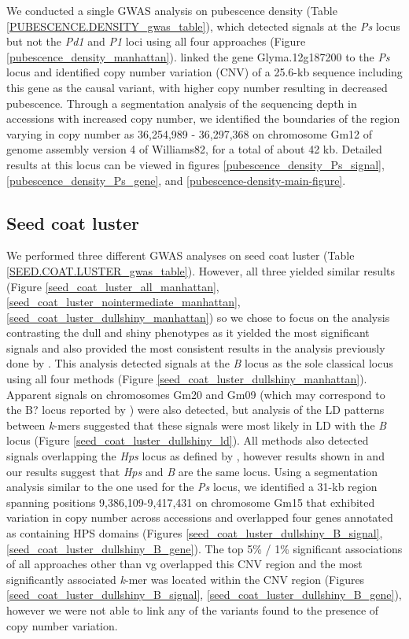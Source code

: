 We conducted a single GWAS analysis on pubescence density (Table
\ref{PUBESCENCE.DENSITY_gwas_table}), which detected signals at the \emph{Ps}
locus but not the \emph{Pd1} and \emph{P1} loci using all four approaches
(Figure \ref{pubescence_density_manhattan}). \cite{liu2020ps} linked the gene
Glyma.12g187200 to the \emph{Ps} locus and identified copy number variation
(CNV) of a 25.6-kb sequence including this gene as the causal variant, with
higher copy number resulting in decreased pubescence. Through a segmentation
analysis of the sequencing depth in accessions with increased copy number, we
identified the boundaries of the region varying in copy number as 36,254,989 -
36,297,368 on chromosome Gm12 of genome assembly version 4 of Williams82, for a
total of about 42 kb. Detailed results at this locus can be viewed in figures
\ref{pubescence_density_Ps_signal}, \ref{pubescence_density_Ps_gene}, and
\ref{pubescence-density-main-figure}.

\subsection*{Seed coat luster}
\label{sv-gwas-seed-coat-luster}

We performed three different GWAS analyses on seed coat luster (Table
\ref{SEED.COAT.LUSTER_gwas_table}).  However, all three yielded similar results
(Figure \ref{seed_coat_luster_all_manhattan},
\ref{seed_coat_luster_nointermediate_manhattan},
\ref{seed_coat_luster_dullshiny_manhattan}) so we chose to focus on the
analysis contrasting the dull and shiny phenotypes as it yielded the most
significant signals and also provided the most consistent results in the
analysis previously done by \cite{bandillo2017}. This analysis detected
signals at the \emph{B} locus as the sole classical locus using all four
methods (Figure \ref{seed_coat_luster_dullshiny_manhattan}). Apparent signals
on chromosomes Gm20 and Gm09 (which may correspond to the B? locus reported by
\cite{bandillo2017}) were also detected, but analysis of the LD patterns
between \emph{k}-mers suggested that these signals were most likely in LD with
the \emph{B} locus (Figure \ref{seed_coat_luster_dullshiny_ld}). All methods
also detected signals overlapping the \emph{Hps} locus as defined by
\cite{bandillo2017}, however results shown in \cite{gijzen2003} and our results
suggest that \emph{Hps} and \emph{B} are the same locus. Using a segmentation analysis
similar to the one used for the \emph{Ps} locus, we identified a 31-kb region
spanning positions 9,386,109-9,417,431 on chromosome Gm15 that exhibited
variation in copy number across accessions and overlapped four genes annotated
as containing HPS domains (Figures \ref{seed_coat_luster_dullshiny_B_signal},
\ref{seed_coat_luster_dullshiny_B_gene}). The top 5\% / 1\% significant
associations of all approaches other than vg overlapped this CNV region and the
most significantly associated \emph{k}-mer was located within the CNV region
(Figures \ref{seed_coat_luster_dullshiny_B_signal},
\ref{seed_coat_luster_dullshiny_B_gene}), however we were not able to link any
of the variants found to the presence of copy number variation.

